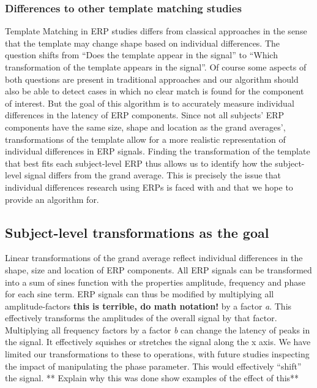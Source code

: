 \documentclass[
  man,floatsintext]{apa7}
\begin{document}
\hypertarget{differences-to-other-template-matching-studies}{%
\subsubsection{Differences to other template matching studies}\label{differences-to-other-template-matching-studies}}

Template Matching in ERP studies differs from classical approaches in the sense that the template may change shape based on individual differences. The question shifts from ``Does the template appear in the signal'' to ``Which transformation of the template appears in the signal''. Of course some aspects of both questions are present in traditional approaches and our algorithm should also be able to detect cases in which no clear match is found for the component of interest. But the goal of this algorithm is to accurately measure individual differences in the latency of ERP components. Since not all subjects' ERP components have the same size, shape and location as the grand averages', transformations of the template allow for a more realistic representation of individual differences in ERP signals. Finding the transformation of the template that best fits each subject-level ERP thus allows us to identify how the subject-level signal differs from the grand average. This is precisely the issue that individual differences research using ERPs is faced with and that we hope to provide an algorithm for.

\hypertarget{subject-level-transformations-as-the-goal}{%
\subsection{Subject-level transformations as the goal}\label{subject-level-transformations-as-the-goal}}

Linear transformations of the grand average reflect individual differences in the shape, size and location of ERP components. All ERP signals can be transformed into a sum of sines function with the properties amplitude, frequency and phase for each sine term. ERP signals can thus be modified by multiplying all amplitude-factors \textbf{this is terrible, do math notation!} by a factor \emph{a}. This effectively transforms the amplitudes of the overall signal by that factor. Multiplying all frequency factors by a factor \emph{b} can change the latency of peaks in the signal. It effectively squishes or stretches the signal along the x axis. We have limited our transformations to these to operations, with future studies inspecting the impact of manipulating the phase parameter. This would effectively ``shift'' the signal.
** Explain why this was done\textbf{
} show examples of the effect of this**
\end{document}
